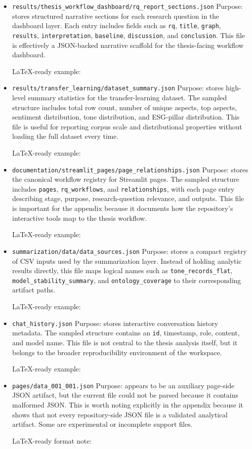 \begin{itemize}
  LaTeX-ready example:
\item
  \texttt{results/thesis\_workflow\_dashboard/rq\_report\_sections.json} Purpose: stores structured narrative sections for each research question in the dashboard layer. Each entry includes fields such as \texttt{rq}, \texttt{title}, \texttt{graph}, \texttt{results}, \texttt{interpretation}, \texttt{baseline}, \texttt{discussion}, and \texttt{conclusion}. This file is effectively a JSON-backed narrative scaffold for the thesis-facing workflow dashboard.

  LaTeX-ready example:
\item
  \texttt{results/transfer\_learning/dataset\_summary.json} Purpose: stores high-level summary statistics for the transfer-learning dataset. The sampled structure includes total row count, number of unique aspects, top aspects, sentiment distribution, tone distribution, and ESG-pillar distribution. This file is useful for reporting corpus scale and distributional properties without loading the full dataset every time.

  LaTeX-ready example:
\item
  \texttt{documentation/streamlit\_pages/page\_relationships.json} Purpose: stores the canonical workflow registry for Streamlit pages. The sampled structure includes \texttt{pages}, \texttt{rq\_workflows}, and \texttt{relationships}, with each page entry describing stage, purpose, research-question relevance, and outputs. This file is important for the appendix because it documents how the repository's interactive tools map to the thesis workflow.

  LaTeX-ready example:
\item
  \texttt{summarization/data/data\_sources.json} Purpose: stores a compact registry of CSV inputs used by the summarization layer. Instead of holding analytic results directly, this file maps logical names such as \texttt{tone\_records\_flat}, \texttt{model\_stability\_summary}, and \texttt{ontology\_coverage} to their corresponding artifact paths.

  LaTeX-ready example:
\item
  \texttt{chat\_history.json} Purpose: stores interactive conversation history metadata. The sampled structure contains an \texttt{id}, timestamp, role, content, and model name. This file is not central to the thesis analysis itself, but it belongs to the broader reproducibility environment of the workspace.

  LaTeX-ready example:
\item
  \texttt{pages/data\_001\_001.json} Purpose: appears to be an auxiliary page-side JSON artifact, but the current file could not be parsed because it contains malformed JSON. This is worth noting explicitly in the appendix because it shows that not every repository-side JSON file is a validated analytical artifact. Some are experimental or incomplete support files.

  LaTeX-ready format note:
\end{itemize}

